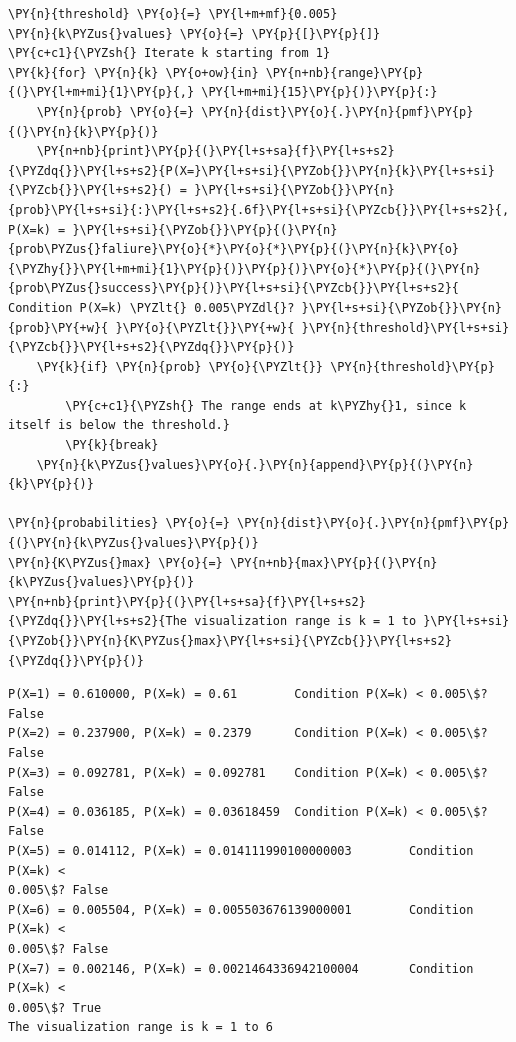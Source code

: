     \begin{tcolorbox}[breakable, size=fbox, boxrule=1pt, pad at break*=1mm,colback=cellbackground, colframe=cellborder]
\begin{Verbatim}[commandchars=\\\{\}]
\PY{n}{threshold} \PY{o}{=} \PY{l+m+mf}{0.005}
\PY{n}{k\PYZus{}values} \PY{o}{=} \PY{p}{[}\PY{p}{]}
\PY{c+c1}{\PYZsh{} Iterate k starting from 1}
\PY{k}{for} \PY{n}{k} \PY{o+ow}{in} \PY{n+nb}{range}\PY{p}{(}\PY{l+m+mi}{1}\PY{p}{,} \PY{l+m+mi}{15}\PY{p}{)}\PY{p}{:}
    \PY{n}{prob} \PY{o}{=} \PY{n}{dist}\PY{o}{.}\PY{n}{pmf}\PY{p}{(}\PY{n}{k}\PY{p}{)}
    \PY{n+nb}{print}\PY{p}{(}\PY{l+s+sa}{f}\PY{l+s+s2}{\PYZdq{}}\PY{l+s+s2}{P(X=}\PY{l+s+si}{\PYZob{}}\PY{n}{k}\PY{l+s+si}{\PYZcb{}}\PY{l+s+s2}{) = }\PY{l+s+si}{\PYZob{}}\PY{n}{prob}\PY{l+s+si}{:}\PY{l+s+s2}{.6f}\PY{l+s+si}{\PYZcb{}}\PY{l+s+s2}{, P(X=k) = }\PY{l+s+si}{\PYZob{}}\PY{p}{(}\PY{n}{prob\PYZus{}faliure}\PY{o}{*}\PY{o}{*}\PY{p}{(}\PY{n}{k}\PY{o}{\PYZhy{}}\PY{l+m+mi}{1}\PY{p}{)}\PY{p}{)}\PY{o}{*}\PY{p}{(}\PY{n}{prob\PYZus{}success}\PY{p}{)}\PY{l+s+si}{\PYZcb{}}\PY{l+s+s2}{	Condition P(X=k) \PYZlt{} 0.005\PYZdl{}? }\PY{l+s+si}{\PYZob{}}\PY{n}{prob}\PY{+w}{ }\PY{o}{\PYZlt{}}\PY{+w}{ }\PY{n}{threshold}\PY{l+s+si}{\PYZcb{}}\PY{l+s+s2}{\PYZdq{}}\PY{p}{)}
    \PY{k}{if} \PY{n}{prob} \PY{o}{\PYZlt{}} \PY{n}{threshold}\PY{p}{:}
        \PY{c+c1}{\PYZsh{} The range ends at k\PYZhy{}1, since k itself is below the threshold.}
        \PY{k}{break}
    \PY{n}{k\PYZus{}values}\PY{o}{.}\PY{n}{append}\PY{p}{(}\PY{n}{k}\PY{p}{)}

\PY{n}{probabilities} \PY{o}{=} \PY{n}{dist}\PY{o}{.}\PY{n}{pmf}\PY{p}{(}\PY{n}{k\PYZus{}values}\PY{p}{)}
\PY{n}{K\PYZus{}max} \PY{o}{=} \PY{n+nb}{max}\PY{p}{(}\PY{n}{k\PYZus{}values}\PY{p}{)}
\PY{n+nb}{print}\PY{p}{(}\PY{l+s+sa}{f}\PY{l+s+s2}{\PYZdq{}}\PY{l+s+s2}{The visualization range is k = 1 to }\PY{l+s+si}{\PYZob{}}\PY{n}{K\PYZus{}max}\PY{l+s+si}{\PYZcb{}}\PY{l+s+s2}{\PYZdq{}}\PY{p}{)}
\end{Verbatim}
\end{tcolorbox}

    \begin{Verbatim}[commandchars=\\\{\}]
P(X=1) = 0.610000, P(X=k) = 0.61        Condition P(X=k) < 0.005\$? False
P(X=2) = 0.237900, P(X=k) = 0.2379      Condition P(X=k) < 0.005\$? False
P(X=3) = 0.092781, P(X=k) = 0.092781    Condition P(X=k) < 0.005\$? False
P(X=4) = 0.036185, P(X=k) = 0.03618459  Condition P(X=k) < 0.005\$? False
P(X=5) = 0.014112, P(X=k) = 0.014111990100000003        Condition P(X=k) <
0.005\$? False
P(X=6) = 0.005504, P(X=k) = 0.005503676139000001        Condition P(X=k) <
0.005\$? False
P(X=7) = 0.002146, P(X=k) = 0.0021464336942100004       Condition P(X=k) <
0.005\$? True
The visualization range is k = 1 to 6
    \end{Verbatim}

